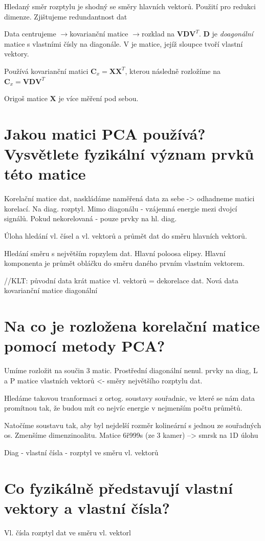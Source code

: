 \documentclass[a4paper,12pt]{article}   %
\newcommand{\rrarr}{$\rightarrow$}
\newcommand{\mt}[1]{$#1$}
\begin{document}
Hledaný směr rozptylu je shodný se směry hlavních vektorů. Použití pro redukci dimenze. Zjištujeme redundantnost dat

Data centrujeme \rrarr kovarianční matice \rrarr rozklad na \mt{\pmb{VDV}^T}. \mt{\pmb D} je \textit{doagonální} matice s vlastními čísly na diagonále. V je matice, jejíž sloupce tvoří vlastní vektory. 

Používá kovarianční matici \mt{\pmb C_x = \pmb{XX}^T}, kterou následně rozložíme na \mt{\pmb C_x = \pmb{VDV}^T}

Origoš matice \mt{\pmb X} je více měření pod sebou. 



\section{Jakou matici PCA používá? Vysvětlete fyzikální význam prvků této matice}
Korelační matice dat, naskládáme naměřená data za sebe -> odhadneme matici korelací. Na diag. rozptyl. Mimo diagonálu - vzájemná energie mezi dvojcí signálů. Pokud nekorelovaná - pouze prvky na hl. diag. 

Úloha hledání vl. čísel a vl. vektorů a průmět dat do směru hlavních vektorů.

Hledání směru s největším ropzylem dat. Hlavní poloosa elipsy. Hlavní komponenta je průmět obláčku do směru daného prvním vlastním vektorem. 

//KLT: původní data krát matice vl. vektorů = dekorelace dat. Nová data kovarianční matice diagonální


\section{Na co je rozložena korelační matice pomocí metody PCA?}
Umíme rozložit na součin 3 matic. Prostřední diagonální nenul. prvky na diag, L a P matice vlastních vektorů <- směry největšího rozptylu dat. 

Hledáme takovou tranformaci z ortog. soustavy souřadnic, ve které se nám data promítnou tak, že budou mít co nejvíc energie v nejmenším počtu průmětů. 

Natočíme soustavu tak, aby byl nejdelší rozměr kolineární s jednou ze souřadných os. Zmenšíme dimenzinoalitu. Matice 6ř999s (ze 3 kamer) --> smrsk na 1D úlohu

Diag - vlastní čísla - rozptyl ve směru vl. vektorů


\section{Co fyzikálně představují vlastní vektory a vlastní čísla?}
Vl. čísla rozptyl dat ve směru vl. vektorl
\end{document}
